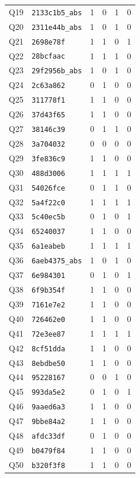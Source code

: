 \begin{longtable}{@{}clcccc@{}}
Q19 & \texttt{2133c1b5\_abs} & 1 & 0 & 1 & 0 \\
Q20 & \texttt{2311e44b\_abs} & 1 & 0 & 1 & 0 \\
Q21 & \texttt{2698e78f} & 1 & 1 & 0 & 1 \\
Q22 & \texttt{28bcfaac} & 1 & 1 & 1 & 0 \\
Q23 & \texttt{29f2956b\_abs} & 1 & 0 & 1 & 0 \\
Q24 & \texttt{2c63a862} & 0 & 1 & 0 & 0 \\
Q25 & \texttt{311778f1} & 1 & 1 & 0 & 0 \\
Q26 & \texttt{37d43f65} & 1 & 1 & 0 & 0 \\
Q27 & \texttt{38146c39} & 0 & 1 & 1 & 0 \\
Q28 & \texttt{3a704032} & 0 & 0 & 0 & 0 \\
Q29 & \texttt{3fe836c9} & 1 & 1 & 0 & 0 \\
Q30 & \texttt{488d3006} & 1 & 1 & 1 & 1 \\
Q31 & \texttt{54026fce} & 0 & 1 & 1 & 0 \\
Q32 & \texttt{5a4f22c0} & 1 & 1 & 1 & 1 \\
Q33 & \texttt{5c40ec5b} & 0 & 1 & 0 & 1 \\
Q34 & \texttt{65240037} & 1 & 1 & 0 & 0 \\
Q35 & \texttt{6a1eabeb} & 1 & 1 & 1 & 1 \\
Q36 & \texttt{6aeb4375\_abs} & 1 & 0 & 1 & 0 \\
Q37 & \texttt{6e984301} & 0 & 1 & 0 & 1 \\
Q38 & \texttt{6f9b354f} & 1 & 1 & 0 & 0 \\
Q39 & \texttt{7161e7e2} & 1 & 1 & 0 & 0 \\
Q40 & \texttt{726462e0} & 1 & 1 & 0 & 0 \\
Q41 & \texttt{72e3ee87} & 1 & 1 & 1 & 1 \\
Q42 & \texttt{8cf51dda} & 1 & 1 & 0 & 0 \\
Q43 & \texttt{8ebdbe50} & 1 & 1 & 0 & 0 \\
Q44 & \texttt{95228167} & 0 & 0 & 1 & 0 \\
Q45 & \texttt{993da5e2} & 0 & 1 & 0 & 1 \\
Q46 & \texttt{9aaed6a3} & 1 & 1 & 0 & 0 \\
Q47 & \texttt{9bbe84a2} & 1 & 1 & 0 & 0 \\
Q48 & \texttt{afdc33df} & 0 & 1 & 0 & 0 \\
Q49 & \texttt{b0479f84} & 1 & 1 & 0 & 0 \\
Q50 & \texttt{b320f3f8} & 1 & 1 & 0 & 0 \\

\end{longtable}
